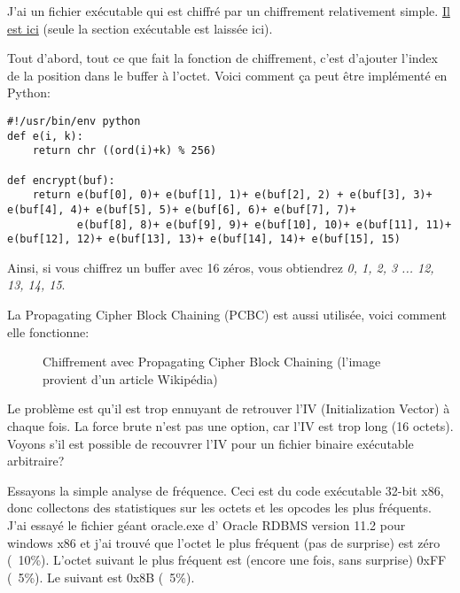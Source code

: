 
J'ai un fichier exécutable qui est chiffré par un chiffrement relativement simple.
\href{https://github.com/DennisYurichev/RE-for-beginners/blob/master/examples/simple_exec_crypto/files/cipher.bin}{Il est ici}
(seule la section exécutable est laissée ici).

Tout d'abord, tout ce que fait la fonction de chiffrement, c'est d'ajouter l'index
de la position dans le buffer à l'octet.
Voici comment ça peut être implémenté en Python:

\begin{lstlisting}[caption=Python script,style=custompy]
#!/usr/bin/env python
def e(i, k):
    return chr ((ord(i)+k) % 256)

def encrypt(buf):
    return e(buf[0], 0)+ e(buf[1], 1)+ e(buf[2], 2) + e(buf[3], 3)+ e(buf[4], 4)+ e(buf[5], 5)+ e(buf[6], 6)+ e(buf[7], 7)+
           e(buf[8], 8)+ e(buf[9], 9)+ e(buf[10], 10)+ e(buf[11], 11)+ e(buf[12], 12)+ e(buf[13], 13)+ e(buf[14], 14)+ e(buf[15], 15)
\end{lstlisting}

Ainsi, si vous chiffrez un buffer avec 16 zéros, vous obtiendrez \emph{0, 1, 2, 3 ... 12, 13, 14, 15}.

La Propagating Cipher Block Chaining (PCBC) est aussi utilisée, voici comment elle
fonctionne:

\begin{figure}[H]
\centering
{}
\caption{Chiffrement avec Propagating Cipher Block Chaining (l'image provient d'un article Wikipédia)}
\end{figure}

Le problème est qu'il est trop ennuyant de retrouver l'IV (Initialization Vector)
à chaque fois.
La force brute n'est pas une option, car l'IV est trop long (16 octets).
Voyons s'il est possible de recouvrer l'IV pour un fichier binaire exécutable arbitraire?

Essayons la simple analyse de fréquence.
Ceci est du code exécutable 32-bit x86, donc collectons des statistiques sur les
octets et les opcodes les plus fréquents.
J'ai essayé le fichier géant oracle.exe d' Oracle RDBMS version 11.2 pour windows
x86 et j'ai trouvé que l'octet le plus fréquent (pas de surprise) est zéro (~10\%).
L'octet suivant le plus fréquent est (encore une fois, sans surprise) 0xFF (~5\%).
Le suivant est 0x8B (~5\%).

